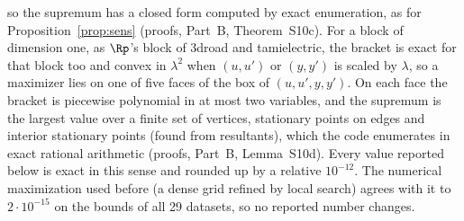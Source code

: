 so the supremum has a closed form computed by exact enumeration, as for Proposition~\ref{prop:sens} (proofs, Part~B, Theorem~S10c). For a block of dimension one, as $\Rp$'s block of 3droad and tamielectric, the bracket is exact for that block too and convex in $\lambda^2$ when $(u, u')$ or $(y, y')$ is scaled by $\lambda$, so a maximizer lies on one of five faces of the box of $(u, u', y, y')$. On each face the bracket is piecewise polynomial in at most two variables, and the supremum is the largest value over a finite set of vertices, stationary points on edges and interior stationary points (found from resultants), which the code enumerates in exact rational arithmetic (proofs, Part~B, Lemma~S10d). Every value reported below is exact in this sense and rounded up by a relative $10^{-12}$. The numerical maximization used before (a dense grid refined by local search) agrees with it to $2 \cdot 10^{-15}$ on the bounds of all 29 datasets, so no reported number changes.

